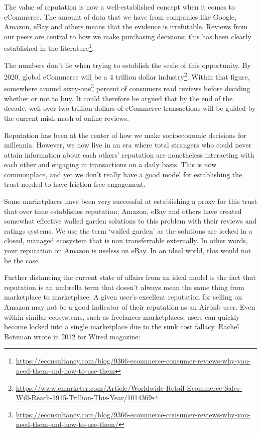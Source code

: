 \documentclass[a4paper]{article}
\begin{document}
The value of reputation is now a well-established concept when it
comes to eCommerce. The amount of data that we have from companies
like Google, Amazon, eBay and others means that the evidence is
irrefutable. Reviews from our peers are central to how we make
purchasing decisions; this has been clearly established in the
literature\footnote{\url{https://econsultancy.com/blog/9366-ecommerce-consumer-reviews-why-you-need-them-and-how-to-use-them}}.
 
The numbers don't lie when trying to establish the scale of this
opportunity. By 2020, global eCommerce will be a 4 trillion dollar
industry\footnote{\url{https://www.emarketer.com/Article/Worldwide-Retail-Ecommerce-Sales-Will-Reach-1915-Trillion-This-Year/1014369}}. Within
that figure, somewhere around
sixty-one\footnote{\url{https://econsultancy.com/blog/9366-ecommerce-consumer-reviews-why-you-need-them-and-how-to-use-them/}}
percent of consumers read reviews before deciding whether or not to
buy. It could therefore be argued that by the end of the decade, well
over two trillion dollars of eCommerce transactions will be guided by
the current mish-mash of online reviews.
 
Reputation has been at the center of how we make socioeconomic
decisions for millennia. However, we now live in an era where total
strangers who could never attain information about each others'
reputation are nonetheless interacting with each other and engaging in
transactions on a daily basis. This is now commonplace, and yet we
don't really have a good model for establishing the trust needed to
have friction free engagement.
 
Some marketplaces have been very successful at establishing a proxy
for this trust that over time establishes reputation; Amazon, eBay and
others have created somewhat effective walled garden solutions to this
problem with their reviews and ratings systems. We use the term
`walled garden' as the solutions are locked in a closed, managed
ecosystem that is non transferrable externally. In other words, your
reputation on Amazon is useless on eBay. In an ideal world, this would
not be the case.
 
Further distancing the current state of affairs from an ideal model is
the fact that reputation is an umbrella term that doesn't always mean
the same thing from marketplace to marketplace. A given user's
excellent reputation for selling on Amazon may not be a good indicator
of their reputation as an Airbnb user. Even within similar ecosystems,
such as freelancer marketplaces, users can quickly become locked into
a single marketplace due to the sunk cost fallacy. Rachel Botsman
wrote in 2012 for Wired magazine:
\end{document}
